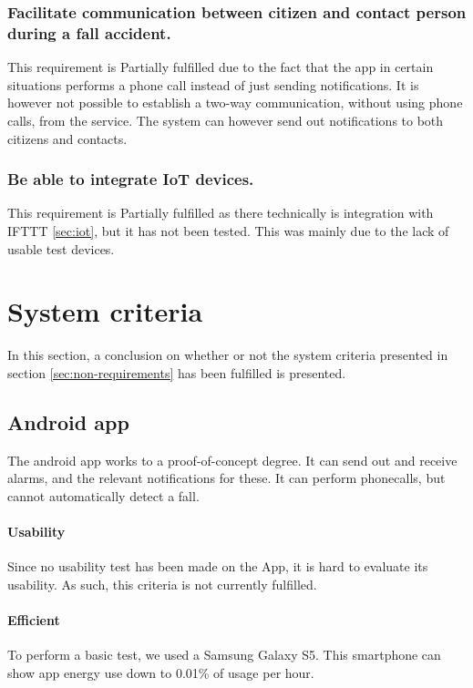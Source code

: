 \subsubsection{Facilitate communication between citizen and contact person during a fall accident.}
This requirement is Partially fulfilled due to the fact that the app in certain situations performs a phone call instead of just sending notifications. It is however not possible to establish a two-way communication, without using phone calls, from the service. The system can however send out notifications to both citizens and contacts.


\subsubsection{Be able to integrate IoT devices.}
This requirement is Partially fulfilled as there technically is integration with IFTTT \ref{sec:iot}, but it has not been tested. This was mainly due to the lack of usable test devices.

\section{System criteria}
In this section, a conclusion on whether or not the system criteria presented in section \ref{sec:non-requirements} has been fulfilled is presented.

\subsection{Android app}
The android app works to a proof-of-concept degree. It can send out and receive alarms, and the relevant notifications for these. It can perform phonecalls, but cannot automatically detect a fall. 
\paragraph{Usability}
Since no usability test has been made on the App, it is hard to evaluate its usability. As such, this criteria is not currently fulfilled.

\paragraph{Efficient}
To perform a basic test, we used a Samsung Galaxy S5. This smartphone can show app energy use down to 0.01\% of usage per hour.

